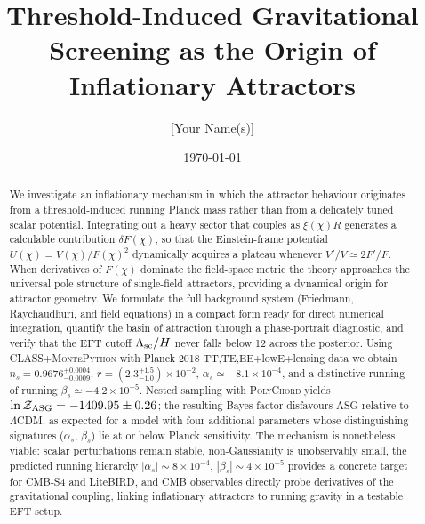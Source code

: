\documentclass[11pt,a4paper]{article}
\title{Threshold-Induced Gravitational Screening as the Origin of Inflationary Attractors}
\author{[Your Name(s)]}
\date{\today}
\begin{document}
\maketitle

\begin{abstract}
We investigate an inflationary mechanism in which the attractor behaviour originates from a threshold-induced running Planck mass rather than from a delicately tuned scalar potential. Integrating out a heavy sector that couples as $\xi(\chi) R$ generates a calculable contribution $\delta F(\chi)$, so that the Einstein-frame potential $U(\chi)=V(\chi)/F(\chi)^2$ dynamically acquires a plateau whenever $V'/V\simeq2F'/F$. When derivatives of $F(\chi)$ dominate the field-space metric the theory approaches the universal pole structure of single-field attractors, providing a dynamical origin for attractor geometry. We formulate the full background system (Friedmann, Raychaudhuri, and field equations) in a compact form ready for direct numerical integration, quantify the basin of attraction through a phase-portrait diagnostic, and verify that the EFT cutoff $\Lambda_{\rm sc}/H$ never falls below 12 across the posterior. Using \textsc{CLASS}+\textsc{MontePython} with Planck 2018 TT,TE,EE+lowE+lensing data we obtain $n_s=0.9676^{+0.0004}_{-0.0009}$, $r=(2.3^{+1.5}_{-1.0})\times10^{-2}$, $\alpha_s\simeq-8.1\times10^{-4}$, and a distinctive running of running $\beta_s\simeq-4.2\times10^{-5}$. Nested sampling with \textsc{PolyChord} yields $\ln\mathcal{Z}_{\rm ASG}=-1409.95\pm0.26$; the resulting Bayes factor disfavours ASG relative to $\Lambda$CDM, as expected for a model with four additional parameters whose distinguishing signatures ($\alpha_s$, $\beta_s$) lie at or below Planck sensitivity. The mechanism is nonetheless viable: scalar perturbations remain stable, non-Gaussianity is unobservably small, the predicted running hierarchy $|\alpha_s|\sim8\times10^{-4}$, $|\beta_s|\sim4\times10^{-5}$ provides a concrete target for CMB-S4 and LiteBIRD, and CMB observables directly probe derivatives of the gravitational coupling, linking inflationary attractors to running gravity in a testable EFT setup.
\end{abstract}
\end{document}
